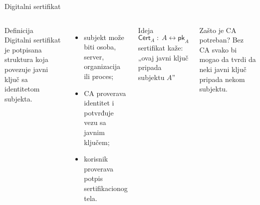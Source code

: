 \documentclass[aspectratio=1610]{beamer}
\newcommand{\sig}[2]{\mathsf{Sig}_{#1}(#2)}
\newcommand{\pk}{\mathsf{pk}}
\newcommand{\sk}{\mathsf{sk}}
\newcommand{\Cert}{\mathsf{Cert}}
\begin{document}
\begin{frame}[t]{Digitalni sertifikat}
\small
\begin{columns}[T,onlytextwidth]
\begin{block}{Definicija}
Digitalni sertifikat je potpisana struktura koja povezuje javni ključ sa identitetom subjekta.
\end{block}

\begin{itemize}
    \item subjekt može biti osoba, server, organizacija ili proces;
    \item CA proverava identitet i potvrđuje vezu sa javnim ključem;
    \item korisnik proverava potpis sertifikacionog tela.
\end{itemize}

\begin{block}{Ideja}
\[
\Cert_A \;:\; A \longleftrightarrow \pk_A
\]
\centering
sertifikat kaže: „ovaj javni ključ pripada subjektu $A$”
\end{block}

\centering
{}

\vspace{0.6em}
\begin{alertblock}{Zašto je CA potreban?}
Bez CA svako bi mogao da tvrdi da neki javni ključ pripada nekom subjektu.
\end{alertblock}
\end{columns}
\end{frame}
\end{document}
